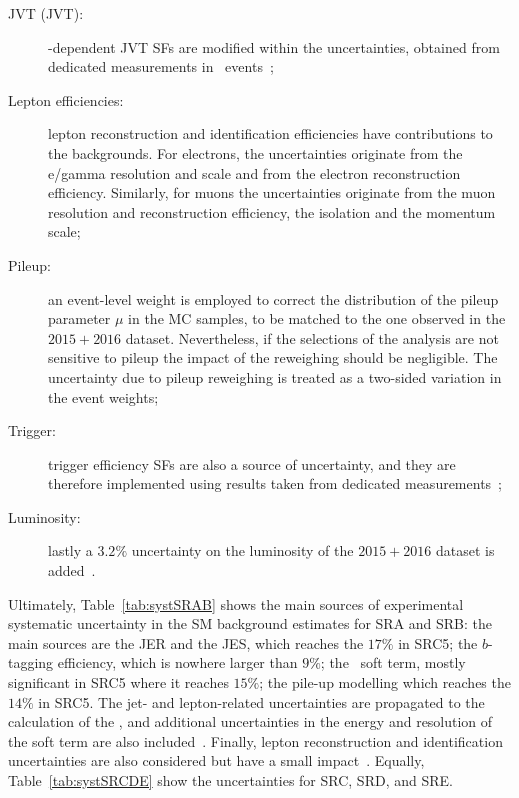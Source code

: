 \begin{description}
				\item [\acl{JVT} (JVT):] \pt-dependent \ac{JVT} \acp{SF} are modified within the uncertainties, obtained from dedicated measurements in \Zmm\ events~\cite{ATLAS-CONF-2014-018};

				\item [Lepton efficiencies:] lepton reconstruction and identification efficiencies have contributions to the backgrounds. For electrons, the uncertainties originate from the e/gamma resolution and scale and from the electron reconstruction efficiency. Similarly, for muons the uncertainties originate from the muon resolution and reconstruction efficiency, the isolation and the momentum scale;

				\item [Pileup:] an event-level weight is employed to correct the distribution of the pileup parameter $\mu$ in the \ac{MC} samples, to be matched to the one observed in the $2015+2016$ dataset. Nevertheless, if the selections of the analysis are not sensitive to pileup the impact of the reweighing should be negligible. The uncertainty due to pileup reweighing is treated as a two-sided variation in the event weights;

				\item [Trigger:] trigger efficiency \acp{SF} are also a source of uncertainty, and they are therefore implemented using results taken from dedicated measurements~\cite{ATLASTrigger2015};

				\item [Luminosity:] lastly a $3.2\%$ uncertainty on the luminosity of the $2015+2016$ dataset is added~\cite{ATLAS2013lumi}.
			\end{description}

			Ultimately, Table~\ref{tab:systSRAB} shows the main sources of experimental systematic uncertainty in the \ac{SM} background estimates for SRA and SRB: the main sources are the \ac{JER} and the \ac{JES}, which reaches the $17\%$ in SRC5; the $b$-tagging efficiency, which is nowhere larger than $9\%$; the \met\ soft term, mostly significant in SRC5 where it reaches $15\%$; the pile-up modelling which reaches the $14\%$ in SRC5. The jet- and lepton-related uncertainties are propagated to the calculation of the \met, and additional uncertainties in the energy and resolution of the soft term are also included~\cite{met}. Finally, lepton reconstruction and identification uncertainties are also considered but have a small impact~\cite{stop0L}. Equally, Table~\ref{tab:systSRCDE} show the uncertainties for SRC, SRD, and SRE.

